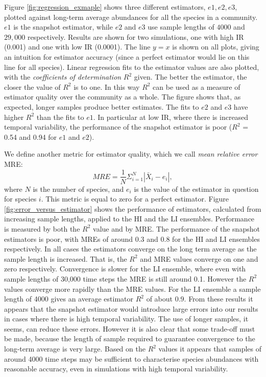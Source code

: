 Figure \ref{fig:regression_exmaple} shows three different estimators, $e1,e2,e3$, plotted against long-term average abundances for all the species in a community. $e1$ is the snapshot estimator, while $e2$ and $e3$ use sample lengths of $4000$ and $29,000$ respectively. Results are shown for two simulations, one with high IR (0.001) and one with low IR (0.0001). The line $y=x$ is shown on all plots, giving an intuition for estimator accuracy (since a perfect estimator would lie on this line for all species). Linear regression fits to the estimator values are also plotted, with the \emph{coefficients of determination} $R^2$ given. The better the estimator, the closer the value of $R^2$ is to one. In this way $R^2$ can be used as a measure of estimator quality over the community as a whole. The figure shows that, as expected, longer samples produce better estimates. The fits to $e2$ and $e3$ have higher $R^2$ than the fits to $e1$. In particular at low IR, where there is increased temporal variability, the performance of the snapshot estimator is poor ($R^2$ = 0.54 and 0.94 for $e1$ and $e2$).

We define another metric for estimator quality, which we call \emph{mean relative error} MRE:
\begin{equation}
MRE = \frac{1}{N} \Sigma_{i=1}^N | \bar{X}_i - e_i |,
\label{eq:mre_est}
\end{equation}
%
where $N$ is the number of species, and $e_i$ is the value of the estimator in question for species $i$. This metric is equal to zero for a perfect estimator. Figure \ref{fig:error_versus_estimator} shows the performance of estimators, calculated from increasing sample lengths, applied to the HI and the LI ensembles. Performance is measured by both the $R^2$ value and by MRE. The performance of the snapshot estimators is poor, with MREs of around $0.3$ and $0.8$ for the HI and LI ensembles respectively. In all cases the estimators converge on the long term average as the sample length is increased. That is, the $R^2$ and MRE values converge on one and zero respectively. Convergence is slower for the LI ensemble, where even with sample lengths of 30,000 time steps the MRE is still around 0.1. However the $R^2$ values converge more rapidly than the MRE values. For the LI ensemble a sample length of 4000 gives an average estimator $R^2$ of about $0.9$. From these results it appears that the snapshot estimator would introduce large errors into our results in cases where there is high temporal variability. The use of longer samples, it seems, can reduce these errors. However it is also clear that some trade-off must be made, because the length of sample required to guarantee convergence to the long-term average is very large. Based on the $R^2$ values it appears that samples of around 4000 time steps may be sufficient to characterise species abundances with reasonable accuracy, even in simulations with high temporal variability.

